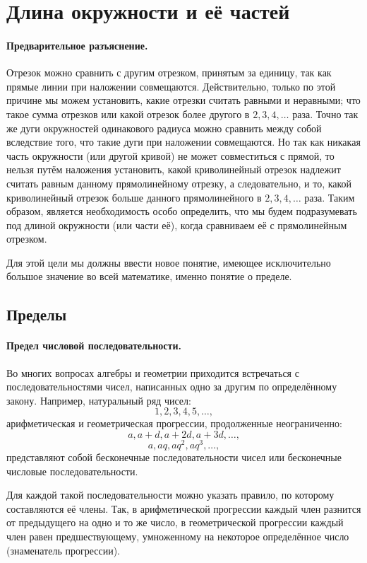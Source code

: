 \section{Длина окружности и её частей}

\paragraph{Предварительное разъяснение.}\label{1938/226}
Отрезок можно сравнить с другим отрезком, принятым за единицу, так как прямые линии при наложении совмещаются.
Действительно, только по этой причине мы можем установить, какие отрезки считать равными и неравными;
что такое сумма отрезков или какой отрезок более другого в $2, 3, 4,\dots$ раза.
Точно так же дуги окружностей одинакового радиуса можно сравнить между собой вследствие того, что такие дуги при наложении совмещаются.
Но так как никакая часть окружности (или другой кривой) не может совместиться с прямой, то нельзя путём наложения установить, какой криволинейный отрезок надлежит считать равным данному прямолинейному отрезку, а следовательно, и то, какой криволинейный отрезок больше данного прямолинейного в $2,3,4,\dots$
раза.
Таким образом, является необходимость особо определить, что мы будем подразумевать под длиной окружности (или части её), когда сравниваем её с прямолинейным отрезком.

Для этой цели мы должны ввести новое понятие, имеющее исключительно большое значение во всей математике, именно понятие о пределе.

\subsection*{Пределы}

\paragraph{Предел числовой последовательности.}\label{1938/227}
Во многих вопросах алгебры и геометрии приходится встречаться с последовательностями чисел, написанных одно за другим по определённому закону.
Например, натуральный ряд чисел:
\[1, 2, 3, 4, 5,\dots,\]
арифметическая и геометрическая прогрессии, продолженные неограниченно:
\[a,a+d,a+2d,a+3d,\dots,\]
\[a,aq,aq^2,aq^3,\dots,\]
представляют собой бесконечные последовательности чисел или бесконечные числовые последовательности.

Для каждой такой последовательности можно указать правило, по которому составляются её члены.
Так, в арифметической прогрессии каждый член разнится от предыдущего на одно и то же число, в геометрической прогрессии каждый член равен предшествующему, умноженному на некоторое определённое число (знаменатель прогрессии).

